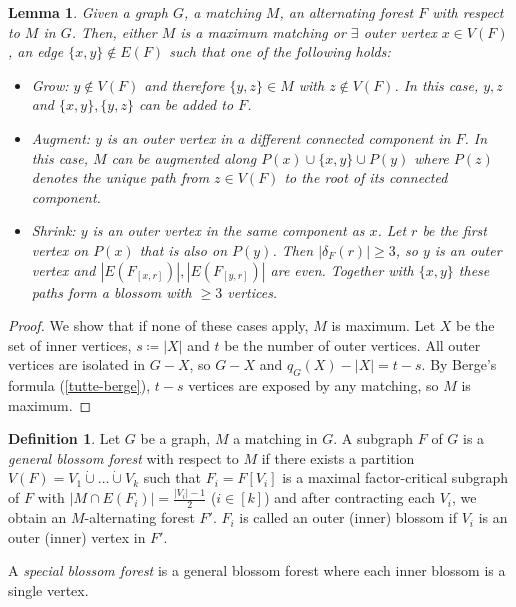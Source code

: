 \documentclass[11pt, a4paper]{article}
\newcommand{\abs}[1]{\left\lvert#1\right\rvert}
\newcommand{\set}[1]{\{#1\}}
\newtheorem{lemma}[theorem]{Lemma}
\theoremstyle{remark}
\theoremstyle{definition}
\newtheorem{definition}[theorem]{Definition}
\begin{document}
\begin{lemma}
Given a graph $G$, a matching $M$, an alternating forest $F$ with respect
to $M$ in $G$. Then, either $M$ is a maximum matching or $\exists$
outer vertex $x\in V(F)$, an edge $\set{x,y}\notin E(F)$ such that one
of the following holds:
\begin{itemize}
	\item Grow: $y\notin V(F)$ and therefore $\set{y,z}\in M$ with
	$z\notin V(F)$. In this case, $y,z$ and $\set{x,y},\set{y,z}$ can
	be added to $F$.

	\item Augment: $y$ is an outer vertex in a different connected component
	in $F$. In this case, $M$ can be augmented along $P(x)\cup\set{x,y}
	\cup P(y)$ where $P(z)$ denotes the unique path from $z\in V(F)$ to
	the root of its connected component.

	\item Shrink: $y$ is an outer vertex in the same component as $x$.
	Let $r$ be the first vertex on $P(x)$ that is also on $P(y)$. Then
	$\abs{\delta_F(r)}\geq 3$, so $y$ is an outer vertex and
	$\abs{E(F_{[x,r]})},\abs{E(F_{[y,r]})}$ are even. Together with
	$\set{x,y}$ these paths form a blossom with $\geq 3$ vertices.
\end{itemize}
\end{lemma}
\begin{proof}
We show that if none of these cases apply, $M$ is maximum. Let $X$ be
the set of inner vertices, $s\coloneqq\abs{X}$ and $t$ be the number
of outer vertices. All outer vertices are isolated in $G-X$, so $G-X$
and $q_G(X)-\abs{X}=t-s$. By Berge's formula (\ref{tutte-berge}), $t-s$
vertices are exposed by any matching, so $M$ is maximum.
\end{proof}

\begin{definition}\label{def:special-blossom-forest}
Let $G$ be a graph, $M$ a matching in $G$. A subgraph $F$ of $G$ is a
\emph{general blossom forest} with respect to $M$ if there exists a
partition $V(F)=V_1\dot\cup\ldots\dot\cup V_k$ such that $F_i=F[V_i]$
is a maximal factor-critical subgraph of $F$ with $\abs{M\cap E(F_i)}
=\frac{\abs{V_i}-1}{2}$ ($i\in [k]$) and after contracting each $V_i$,
we obtain an $M$-alternating forest $F'$.
 $F_i$ is called an outer (inner) blossom if $V_i$ is an outer (inner)
vertex in $F'$.

A \emph{special blossom forest} is a general blossom forest where each
inner blossom is a single vertex.
\end{definition}
\end{document}
